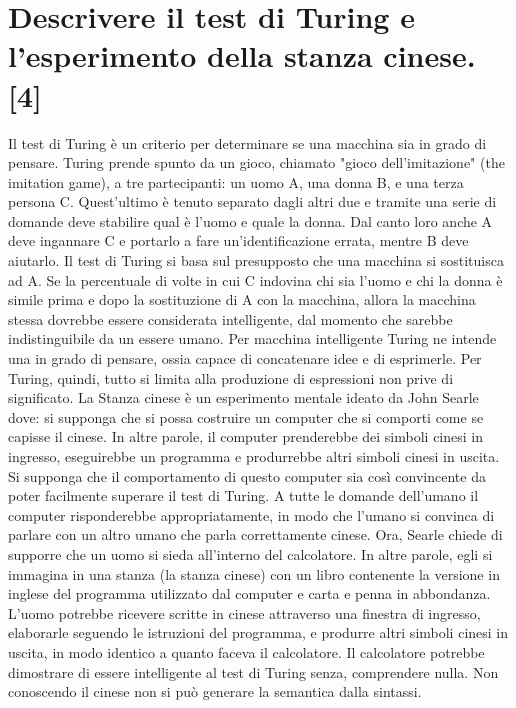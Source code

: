 \documentclass[\main/main.tex]{subfiles}
\begin{document}
\section{Descrivere il test di Turing e l'esperimento della stanza cinese. [4]}
Il test di Turing è un criterio per determinare se una macchina sia in grado di pensare. Turing prende spunto da un gioco, chiamato "gioco dell'imitazione" (the imitation game), a tre partecipanti: un uomo A, una donna B, e una terza persona C. Quest'ultimo è tenuto separato dagli altri due e tramite una serie di domande deve stabilire qual è l'uomo e quale la donna. Dal canto loro anche A deve ingannare C e portarlo a fare un'identificazione errata, mentre B deve aiutarlo.
Il test di Turing si basa sul presupposto che una macchina si sostituisca ad A. Se la percentuale di volte in cui C indovina chi sia l'uomo e chi la donna è simile prima e dopo la sostituzione di A con la macchina, allora la macchina stessa dovrebbe essere considerata intelligente, dal momento che sarebbe indistinguibile da un essere umano.
Per macchina intelligente Turing ne intende una in grado di pensare, ossia capace di concatenare idee e di esprimerle. Per Turing, quindi, tutto si limita alla produzione di espressioni non prive di significato.
La Stanza cinese è un esperimento mentale ideato da John Searle dove: si supponga che si possa costruire un computer che si comporti come se capisse il cinese. In altre parole, il computer prenderebbe dei simboli cinesi in ingresso, eseguirebbe un programma e produrrebbe altri simboli cinesi in uscita. Si supponga che il comportamento di questo computer sia così convincente da poter facilmente superare il test di Turing. A tutte le domande dell'umano il computer risponderebbe appropriatamente, in modo che l'umano si convinca di parlare con un altro umano che parla correttamente cinese.
Ora, Searle chiede di supporre che un uomo si sieda all'interno del calcolatore. In altre parole, egli si immagina in una stanza (la stanza cinese) con un libro contenente la versione in inglese del programma utilizzato dal computer e carta e penna in abbondanza. L'uomo potrebbe ricevere scritte in cinese attraverso una finestra di ingresso, elaborarle seguendo le istruzioni del programma, e produrre altri simboli cinesi in uscita, in modo identico a quanto faceva il calcolatore.
Il calcolatore potrebbe dimostrare di essere intelligente al test di Turing senza, comprendere nulla. Non conoscendo il cinese non si può generare la semantica dalla sintassi.
\end{document}
